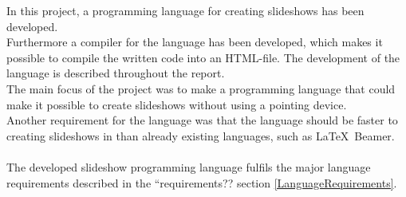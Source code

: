 In this project, a programming language for creating slideshows has been developed. \\
Furthermore a compiler for the language has been developed, which makes it possible to compile the written code into an HTML-file. The development of the language is described throughout the report. \\
The main focus of the project was to make a programming language that could make it possible to create slideshows without using a pointing device. \\
Another requirement for the language was that the language should be faster to creating slideshows in than already existing languages, such as \LaTeX~Beamer.
\\ \\
The developed slideshow programming language fulfils the major language requirements described in the ``requirements?? section \ref{LanguageRequirements}.
